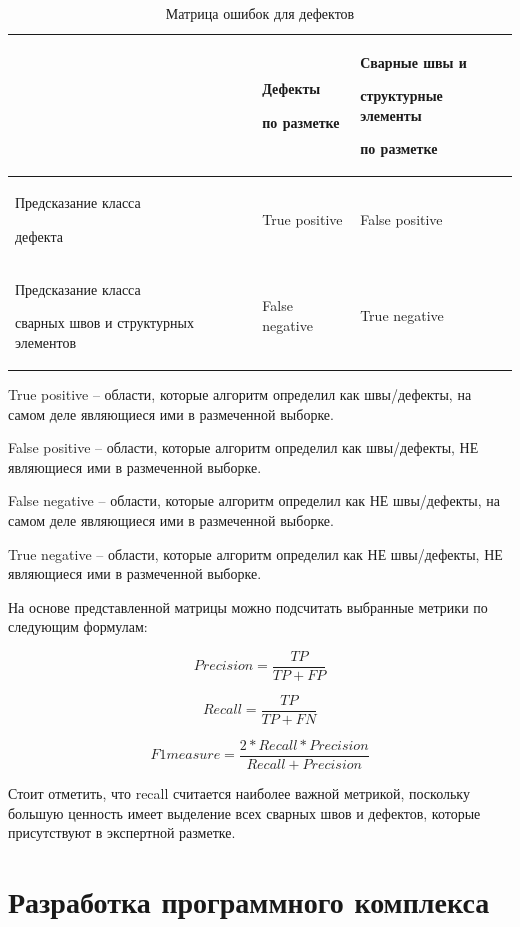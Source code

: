\documentclass[a4paper,article,14pt]{extarticle}
\begin{document}
\begin{center}
\begin{longtable}{|p{5cm}|p{5cm}|p{6cm}|}
    \caption{Матрица ошибок для дефектов}\\\hline
        & Дефекты \par по разметке & Сварные швы и \par структурные элементы \par по разметке \\ \hline
    Предсказание класса\par дефекта & True positive & False positive \\ \hline
    Предсказание класса \par сварных швов и структурных элементов & False negative & True negative \\ \hline
\end{longtable}
\end{center}

True positive – области, которые алгоритм определил как швы/дефекты, на самом деле являющиеся ими в размеченной выборке.

False positive – области, которые алгоритм определил как швы/дефекты, НЕ являющиеся ими в размеченной выборке.

False negative – области, которые алгоритм определил как НЕ швы/дефекты, на самом деле являющиеся ими в размеченной выборке.

True negative – области, которые алгоритм определил как НЕ швы/дефекты, НЕ являющиеся ими в размеченной выборке.

На основе представленной матрицы можно подсчитать выбранные метрики по следующим формулам:

\begin{equation}
    Precision = \frac{TP}{TP+FP}
\end{equation}

\begin{equation}
    Recall = \frac{TP}{TP+FN}
\end{equation}

\begin{equation}
    F1measure = \frac{2*Recall*Precision}{Recall+Precision}
\end{equation}

Стоит отметить, что recall считается наиболее важной метрикой, поскольку большую ценность имеет выделение всех сварных швов и дефектов, которые присутствуют в экспертной разметке. 


\section{Разработка программного комплекса}
\end{document}
